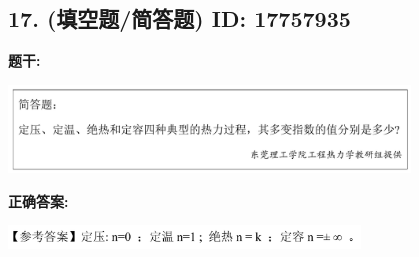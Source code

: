 \documentclass[12pt]{article}
\begin{document}
\vspace{0.5em}\hrulefill\vspace{1em}

\subsection*{17. (填空题/简答题) \small ID: 17757935}

\textbf{题干:}


\begin{center}\includegraphics[width=0.8\textwidth, height=0.25\textheight, keepaspectratio]{question_17_17757935/title_img_1.png}\end{center}

\textbf{正确答案:}

\begin{center}\includegraphics[width=0.7\textwidth, height=0.2\textheight, keepaspectratio]{question_17_17757935/correct_answer_1_img_1.png}\end{center}

\vspace{0.5em}\hrulefill\vspace{1em}
\end{document}
